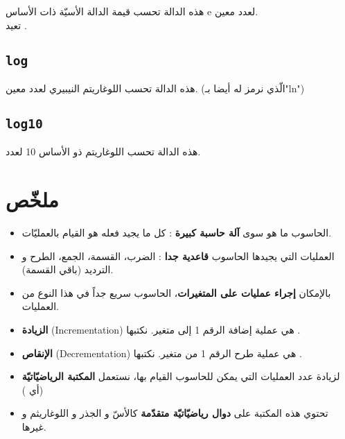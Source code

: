 هذه الدالة تحسب قيمة الدالة الأسيّة ذات الأساس
\textenglish{e}
لعدد معين.\\
تعيد
.

\subsection{\texttt{log}}

هذه الدالة تحسب اللوغاريتم النيبيري لعدد معين. (الّذي نرمز له أيضا بـ"\textenglish{ln}")

\subsection{\texttt{log10}}

هذه الدالة تحسب اللوغاريتم ذو الأساس 10 لعدد.

\section*{ملخّص}

\begin{itemize}
  \item الحاسوب ما هو سوى
\textbf{آلة حاسبة كبيرة}
: كل ما يجيد فعله هو القيام بالعمليّات.
  \item العمليات التي يجيدها الحاسوب
\textbf{قاعدية جدا}
: الضرب، القسمة، الجمع، الطرح و الترديد (باقي القسمة).
  \item بالإمكان
\textbf{إجراء عمليات على المتغيرات}،
الحاسوب سريع جداً في هذا النوع من العمليات.
  \item \textbf{الزيادة}
(\textenglish{Incrementation})
هي عملية إضافة الرقم 1 إلى متغير. نكتبها
.
  \item \textbf{الإنقاص}
(\textenglish{Decrementation})
هي عملية طرح الرقم 1 من متغير. نكتبها
.
  \item لزيادة عدد العمليات التي يمكن للحاسوب القيام بها، نستعمل
\textbf{المكتبة الرياضيّاتيّة}
(أي
)
  \item تحتوي هذه المكتبة على
\textbf{دوال رياضيّاتيّة متقدّمة}
كالأسّ و الجذر و اللوغاريثم و غيرها.
\end{itemize}
